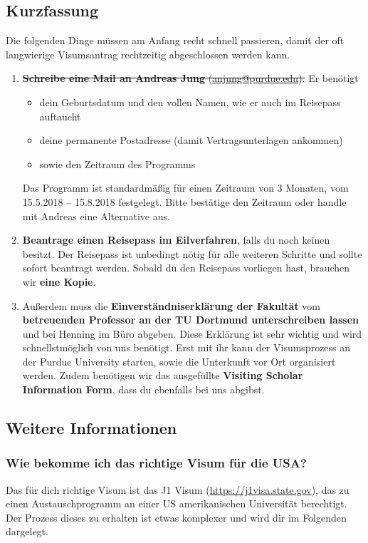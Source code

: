 \documentclass[
  paper=a4,
  fontsize=12pt,
  DIV=16,
  headheight=52pt,
  footheight=45pt,
  headinclude,
  parskip=full,
]{scrartcl}
\begin{document}
\subsection*{Kurzfassung}
Die folgenden Dinge müssen am Anfang recht schnell passieren, damit der oft langwierige Visumsantrag rechtzeitig abgeschlossen werden kann.
\begin{enumerate}
  \item \sout{\textbf{Schreibe eine Mail an Andreas Jung} (\href{mailto:anjung@purdue.edu}{anjung@purdue.edu}).}
    Er benötigt
    \begin{itemize}
      \item dein Geburtsdatum und den vollen Namen, wie er auch im Reisepass auftaucht
      \item deine permanente Postadresse (damit Vertragsunterlagen ankommen)
      \item sowie den Zeitraum des Programms
    \end{itemize}
    Das Programm ist standardmäßig für einen Zeitraum von 3 Monaten, vom 15.5.2018 – 15.8.2018 festgelegt.
    Bitte bestätige den Zeitraum oder handle mit Andreas eine Alternative aus.
  \item \textbf{Beantrage einen Reisepass im Eilverfahren}, falls du noch keinen besitzt.
    Der Reisepass ist unbedingt nötig für alle weiteren Schritte und sollte sofort beantragt werden.
    Sobald du den Reisepass vorliegen hast, brauchen wir \textbf{eine Kopie}.
  \item Außerdem muss die \textbf{Einverständniserklärung der Fakultät} vom \textbf{betreuenden Professor an der TU Dortmund unterschreiben lassen} und bei Henning im Büro abgeben.
  Diese Erklärung ist sehr wichtig und wird schnellstmöglich von uns benötigt.
  Erst mit ihr kann der Visumsprozess an der Purdue University starten, sowie die Unterkunft vor Ort organisiert werden.
  Zudem benötigen wir das ausgefüllte \textbf{Visiting Scholar Information Form}, dass du ebenfalls bei uns abgibst.
\end{enumerate}


\subsection*{Weitere Informationen}
\subsubsection*{Wie bekomme ich das richtige Visum für die USA?}
Das für dich richtige Visum ist das J1 Visum (\url{https://j1visa.state.gov}), das zu einen Austauschprogramm an einer US amerikanischen Universität berechtigt.
Der Prozess dieses zu erhalten ist etwas komplexer und wird dir im Folgenden dargelegt.
\end{document}
